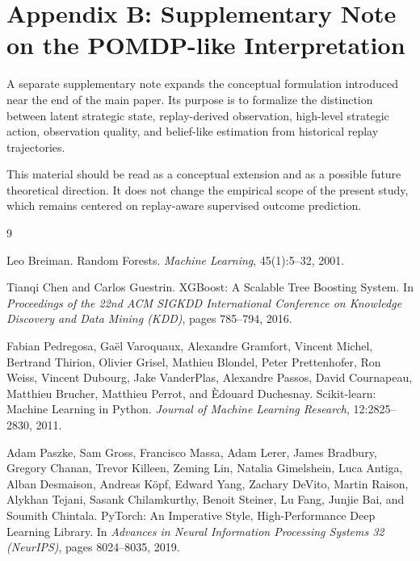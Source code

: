 \documentclass[11pt,a4paper]{article}
\begin{document}
\clearpage

\section{Appendix B: Supplementary Note on the POMDP-like Interpretation}
A separate supplementary note expands the conceptual formulation introduced near the end of the main paper. Its purpose is to formalize the distinction between latent strategic state, replay-derived observation, high-level strategic action, observation quality, and belief-like estimation from historical replay trajectories.

This material should be read as a conceptual extension and as a possible future theoretical direction. It does not change the empirical scope of the present study, which remains centered on replay-aware supervised outcome prediction.


\begin{thebibliography}{9}
	
	Leo Breiman.
	\newblock Random Forests.
	\newblock \emph{Machine Learning}, 45(1):5--32, 2001.
	
	Tianqi Chen and Carlos Guestrin.
	\newblock XGBoost: A Scalable Tree Boosting System.
	\newblock In \emph{Proceedings of the 22nd ACM SIGKDD International Conference on Knowledge Discovery and Data Mining (KDD)}, pages 785--794, 2016.
	
	Fabian Pedregosa, Ga\"el Varoquaux, Alexandre Gramfort, Vincent Michel, Bertrand Thirion, Olivier Grisel, Mathieu Blondel, Peter Prettenhofer, Ron Weiss, Vincent Dubourg, Jake VanderPlas, Alexandre Passos, David Cournapeau, Matthieu Brucher, Matthieu Perrot, and \`Edouard Duchesnay.
	\newblock Scikit-learn: Machine Learning in Python.
	\newblock \emph{Journal of Machine Learning Research}, 12:2825--2830, 2011.
	
	Adam Paszke, Sam Gross, Francisco Massa, Adam Lerer, James Bradbury, Gregory Chanan, Trevor Killeen, Zeming Lin, Natalia Gimelshein, Luca Antiga, Alban Desmaison, Andreas K\"opf, Edward Yang, Zachary DeVito, Martin Raison, Alykhan Tejani, Sasank Chilamkurthy, Benoit Steiner, Lu Fang, Junjie Bai, and Soumith Chintala.
	\newblock PyTorch: An Imperative Style, High-Performance Deep Learning Library.
	\newblock In \emph{Advances in Neural Information Processing Systems 32 (NeurIPS)}, pages 8024--8035, 2019.
	
\end{thebibliography}
\end{document}
